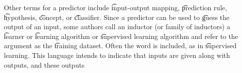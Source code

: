 Other terms for a predictor include \t{input-output} mapping, \t{prediction rule}, \t{hypothesis}, \t{concept}, or \t{classifier}.
Since a predictor can be used to \t{guess} the output of an input, some authors call an inductor (or family of inductors) a \t{learner} or \t{learning algorithm} or \t{supervised learning algorithm} and refer to the argument as the \t{training dataset}.
Often the word  is included, as in \t{supervised learning}.
This language intends to indicate that inputs are given along with outputs, and these outputs 
